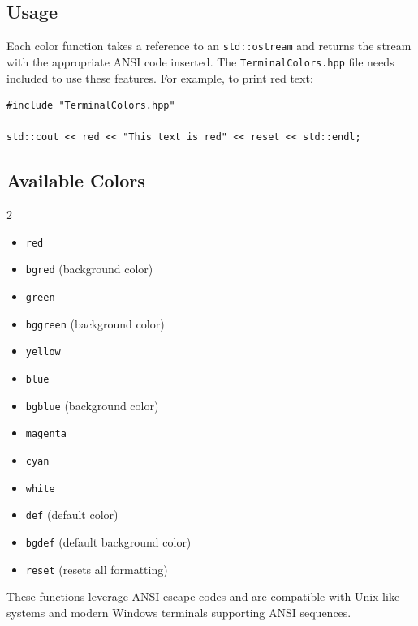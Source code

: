\subsection*{Usage}

Each color function takes a reference to an \texttt{std::ostream} and returns the stream with the appropriate ANSI code inserted. The \texttt{TerminalColors.hpp} file needs included to use these features. For example, to print red text:

\begin{lstlisting}[style=cppstyle]
#include "TerminalColors.hpp"

std::cout << red << "This text is red" << reset << std::endl;
\end{lstlisting}

\subsection*{Available Colors}

\begin{multicols}{2}
\begin{itemize}\itemsep0em
	\item \texttt{red}
	\item \texttt{bgred} (background color)
	\item \texttt{green}
	\item \texttt{bggreen} (background color)
	\item \texttt{yellow}
	\item \texttt{blue}
	\item \texttt{bgblue} (background color)
	\item \texttt{magenta}
	\item \texttt{cyan}
	\item \texttt{white}
	\item \texttt{def} (default color)
	\item \texttt{bgdef} (default background color)
	\item \texttt{reset} (resets all formatting)
\end{itemize}
\end{multicols}
These functions leverage ANSI escape codes and are compatible with Unix-like systems and modern Windows terminals supporting ANSI sequences.


















